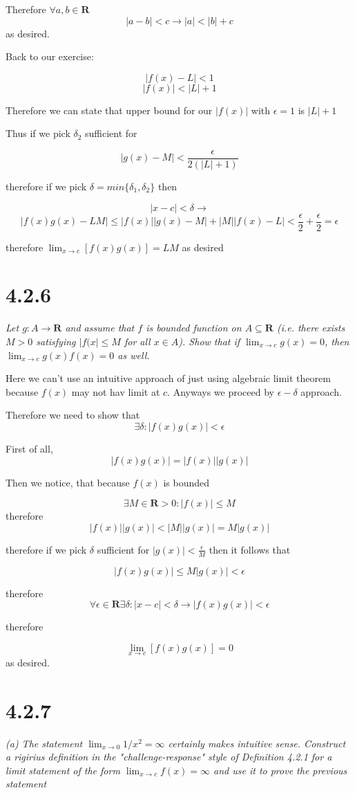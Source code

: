 \documentclass[11pt,oneside,titlepage]{article}
\begin{document}
Therefore $\forall a,b\in \textbf{R}$
$$|a - b| < c \to |a| < |b| + c$$
as desired.

Back to our exercise: 

$$|f(x) - L| < 1$$
$$|f(x)| < |L| + 1$$

Therefore we can state that upper bound for our $|f(x)|$ with $\epsilon = 1$ is $|L| + 1$

Thus if we pick $\delta_2$ sufficient for

$$|g(x) - M| < \frac{\epsilon}{2(|L| + 1)}$$

therefore if we pick $\delta = min\{\delta_1, \delta_2\}$ then

$$|x - c| < \delta \to $$
$$|f(x)g(x) - LM| \leq |f(x)||g(x) - M| + |M||f(x) - L| <  \frac{\epsilon}{2} +
\frac{\epsilon}{2} = \epsilon  $$

therefore $\lim_{x \to c}[f(x) g(x)] = LM$ as desired

\section*{4.2.6}
\textit{Let $g: A\to \textbf{R}$ and assume that $f$ is bounded function on $A \subseteq \textbf{R}$
  (i.e. there exists $M > 0$ satisfying $|f(x| \leq M$ for all $x \in A$). Show that
  if $\lim_{x \to c}g(x) = 0$, then $\lim_{x \to c}g(x)f(x) = 0$ as well.}

Here we can't use an intuitive approach of just using algebraic limit theorem because $f(x)$ may
not hav limit at $c$.
Anyways we proceed by $\epsilon-\delta$ approach.

Therefore we need to show that
$$\exists \delta: |f(x)g(x)| < \epsilon$$

First of all,
$$ |f(x)g(x)| = |f(x)||g(x)|$$

Then we notice, that because $f(x)$ is bounded

$$\exists M \in \textbf{R} > 0: |f(x)| \leq M$$
therefore
$$|f(x)||g(x)| < |M||g(x)| = M|g(x)|$$

therefore if we pick $\delta$ sufficient for $|g(x)| < \frac{\epsilon}{M}$ then it follows that

$$|f(x)g(x)| \leq M|g(x)| < \epsilon$$

therefore
$$\forall \epsilon \in \textbf{R} \exists \delta : |x - c| < \delta \to |f(x)g(x)| < \epsilon$$

therefore

$$\lim_{x \to c}[f(x)g(x)] = 0$$
as desired.

\section*{4.2.7}
\textit{(a) The statement $\lim_{x \to 0}1/x^2 = \infty$ certainly makes intuitive sense. Construct a rigirius definition in the "challenge-response" style of Definition 4.2.1 for a limit statement of the form $\lim_{x \to c}f(x) = \infty$ and use it to prove the previous statement }
\end{document}
